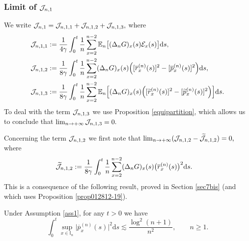 \documentclass[EJP]{ejpecp} %
\newcommand\T{{\mathbb I}}
\newcommand \ga{\gamma}
\renewcommand{\ge}{\geqslant}
\newcommand{\dd  }{\mathrm{d}}
\renewcommand{\tilde}{\widetilde}
\renewcommand{\bar}{\overline}
\numberwithin{equation}{section}
\begin{document}
\subsubsection{Limit of ${\cal J}_{n,1}$}

We write
$
{\cal J}_{n,1}={\cal J}_{n,1,1}+{\cal J}_{n,1,2}+{\cal J}_{n,1,3},$
where
\begin{align*}
&
{\cal J}_{n,1,1}:=\frac{1}{4\ga}\int_0^{t} \frac 1{n}  \sum_{x=2}^{n-2}
                                         {\mathbb E}_n\big[          (\Delta_n G)_x(s)
  {\cal E}_x(s) \big]  \dd s,\\
&
{\cal J}_{n,1,2}:=\frac{1}{8\ga}\int_0^{t} \frac 1{n}  \sum_{x=2}^{n-2}
                                                  (\Delta_n G)_x(s)
  \Big([\bar r_x^{(n)}(s) ]^2-[\bar p_x^{(n)}(s) ]^2\Big)\dd s ,\\                                          
&
{\cal J}_{n,1,3}:=\frac{1}{8\ga}\int_0^{t}  \frac 1{n}  \sum_{x=2}^{n-2}
                                    {\mathbb E}_n\Big[               (\Delta_n G)_x(s)
   \Big([\tilde r_x^{(n)}(s) ]^2-[\tilde p_x^{(n)}(s) ]^2\Big)
                                                 \Big] \dd s .
\end{align*}
To deal with the term ${\cal J}_{n,1,3}$ we use Proposition \ref{equipartition}, which allows us to conclude that
$
\lim_{n\to+\infty}{\cal J}_{n,1,3}=0.
$


















Concerning the term ${\cal J}_{n,1,2}$ we first note that
$
\lim_{n\to+\infty}({\cal J}_{n,1,2}-\tilde{\cal J}_{n,1,2})=0,
$
where
\begin{align*}
&
\tilde {\cal J}_{n,1,2}:=\frac{1}{8\ga}\int_0^{t}   \frac 1{n}  \sum_{x=2}^{n-2}
                                                  (\Delta_n G)_x
  (s) \big(\bar r_x^{(n)}(s) \big)^2\dd s.
\end{align*}
This is a consequence of the following result, proved in Section \ref{sec7bis} (and which uses Proposition \ref{prop012812-19}). 

\begin{lemma}
\label{lm010911-19}
Under Assumption \ref{ass1}, for any $t>0$ we have
\begin{equation}
\label{052412-19}
\int_0^t\sup_{x\in\T_n}\big|\bar p^{(n)}_{x}(s)\big|^2\dd s\lesssim \frac{\log^2
  (n+1)}{n^2},\qquad n\ge1.
\end{equation}
\end{lemma}
\end{document}

